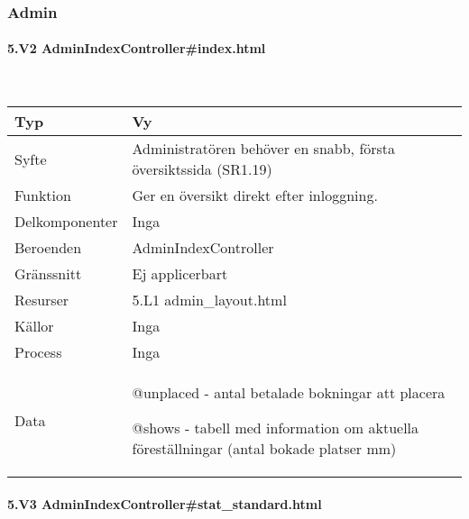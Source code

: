 \documentclass[a4paper, twoside, 11pt, titlepage]{article}
\begin{document}
		\subsubsection{Admin}



			\paragraph{5.V2 AdminIndexController\#index.html}\

			\begin {table} [ht] \begin{tabular} {  p{3.5cm} p{9.6cm} }
				\hline
				{Typ} & {Vy} \\
				\hline
				{Syfte} & {Administratören behöver en snabb, första översiktssida (SR1.19)} \\
				\hline
				{Funktion} & {Ger en översikt direkt efter inloggning.} \\
				\hline
				{Delkomponenter} & {Inga} \\
				\hline
				{Beroenden} & {AdminIndexController} \\
				\hline
				{Gränssnitt} & {Ej applicerbart} \\
				\hline
				{Resurser} & {5.L1 admin\_layout.html} \\
				\hline
				{Källor} & {Inga} \\
				\hline
				{Process} & {Inga} \\
				\hline
				{Data} & {@unplaced - antal betalade bokningar att placera

@shows - tabell med information om aktuella föreställningar (antal bokade platser mm)} \\
				\hline
			\end{tabular} \end{table} \FloatBarrier


			\paragraph{5.V3 AdminIndexController\#stat\_standard.html}\
\end{document}
